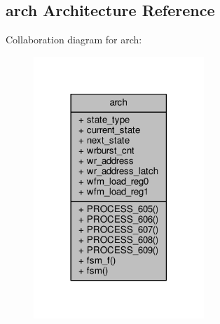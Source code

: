 \subsection{arch Architecture Reference}
\label{classwfm__wcmd__fsm_1_1arch}


Collaboration diagram for arch\+:\nopagebreak
\begin{figure}[H]
\begin{center}
\leavevmode
\includegraphics[width=182pt]{df/dc1/classwfm__wcmd__fsm_1_1arch__coll__graph}
\end{center}
\end{figure}
